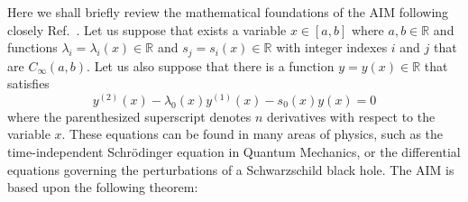 Here we shall briefly review the mathematical foundations of the AIM following closely Ref.~\cite{aim_original}. Let us suppose that exists a variable $x \in [a,b]$ where $a,b \in \mathbb{R}$ and functions $\lambda_i = \lambda_i(x) \in \mathbb{R}$ and $s_j = s_i(x) \in \mathbb{R}$ with integer indexes $i$ and $j$ that are $C_\infty(a,b)$. Let us also suppose that there is a function $y=y(x)\in\mathbb{R}$ that satisfies
%
\begin{equation}
  y^{(2)}(x) - \lambda_0(x) y^{(1)}(x) - s_0(x)y(x) = 0
  \label{eq:aim_general_ode}
\end{equation}
%
where the parenthesized superscript denotes $n$ derivatives with respect to the variable $x$. These equations can be found in many areas of physics, such as the time-independent Schr\"odinger equation in Quantum Mechanics, or the differential equations governing the perturbations of a Schwarzschild black hole. The AIM is based upon the following theorem:

